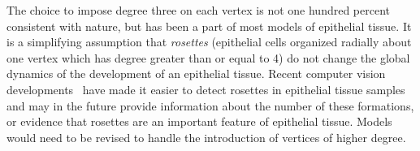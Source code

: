The choice to impose degree three on each vertex is not one hundred percent consistent with nature, but has been a part of most models of epithelial tissue.  It is a simplifying assumption that \emph{rosettes} (epithelial cells organized radially about one vertex which has degree greater than or equal to 4) do not change the global dynamics of the development of an epithelial tissue.  Recent computer vision developments~\cite{rose} have made it easier to detect rosettes in epithelial tissue samples and may in the future provide information about the number of these formations, or evidence that rosettes are an important feature of epithelial tissue. Models would need to be revised to handle the introduction of vertices of higher degree.

